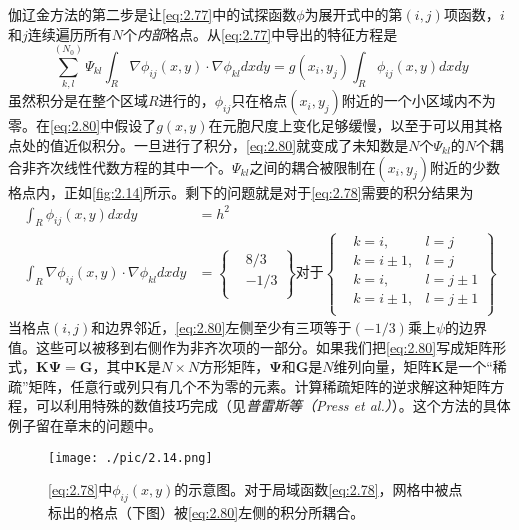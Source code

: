 \documentclass[12pt]{book}
\numberwithin{equation}{chapter}
\numberwithin{figure}{chapter}
\numberwithin{footnote}{page}
\begin{document}
伽辽金方法的第二步是让\autoref{eq:2.77}中的试探函数$\phi$为展开式中的第$(i,j)$项函数，$i$和$j$连续遍历所有$N$个\textit{内部}格点。从\autoref{eq:2.77}中导出的特征方程是
\begin{equation}\label{eq:2.80}
    \sum_{k,l}^{(N_0)}\Psi_{kl}\int_R \nabla\phi_{ij}(x,y)\cdot\nabla\phi_{kl} dxdy=g(x_i,y_j)\int_R \phi_{ij}(x,y)dxdy
\end{equation}
虽然积分是在整个区域$R$进行的，$\phi_{ij}$只在格点$(x_i,y_j)$附近的一个小区域内不为零。在\autoref{eq:2.80}中假设了$g(x,y)$在元胞尺度上变化足够缓慢，以至于可以用其格点处的值近似积分。一旦进行了积分，\autoref{eq:2.80}就变成了未知数是$N$个$\Psi_{kl}$的$N$个耦合非齐次线性代数方程的其中一个。$\Psi_{kl}$之间的耦合被限制在$(x_i,y_j)$附近的少数格点内，正如\autoref{fig:2.14}所示。剩下的问题就是对于\autoref{eq:2.78}需要的积分结果为
\begin{equation}\label{eq:2.81}
    \begin{aligned}
        \int_R \phi_{ij}(x,y)dxdy&=h^2\\
        \int_R \nabla\phi_{ij}(x,y)\cdot\nabla\phi_{kl} dxdy&=\left\{ 
        \begin{aligned}
            &8/3\\
            &-1/3\\
        \end{aligned} \right\} \mbox{对于}\left\{ 
        \begin{aligned}
            &k=i,&l=j\\
            &k=i\pm 1,&l=j\\
            &k=i,&l=j\pm 1\\
            &k=i\pm 1,&l=j\pm 1\\ 
        \end{aligned}
        \right\}
    \end{aligned}
\end{equation}
当格点$(i,j)$和边界邻近，\autoref{eq:2.80}左侧至少有三项等于$(-1/3)$乘上$\psi$的边界值。这些可以被移到右侧作为非齐次项的一部分。如果我们把\autoref{eq:2.80}写成矩阵形式，$\mathbf{K}\boldsymbol{\Psi}=\mathbf{G}$，其中$\mathbf{K}$是$N\times N$方形矩阵，$\boldsymbol{\Psi}$和$\mathbf{G}$是$N$维列向量，矩阵$\mathbf{K}$是一个“稀疏”矩阵，任意行或列只有几个不为零的元素。计算稀疏矩阵的逆求解这种矩阵方程，可以利用特殊的数值技巧完成（见\textit{普雷斯等（Press et al.）}）。这个方法的具体例子留在章末的问题中。

\begin{figure}[!ht]
    \centering
    \texttt{[image: ./pic/2.14.png]}
    \captionsetup{justification=raggedright, singlelinecheck=false}
    \caption{\autoref{eq:2.78}中$\phi_{ij}(x,y)$的示意图。对于局域函数\autoref{eq:2.78}，网格中被点标出的格点（下图）被\autoref{eq:2.80}左侧的积分所耦合。}
    \label{fig:2.14}
\end{figure}
\end{document}
